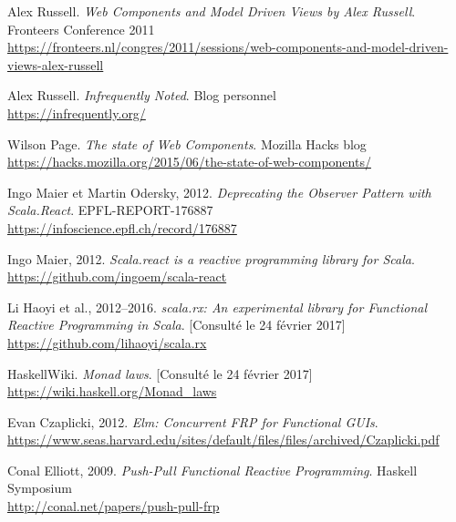 \begin{thebibliography}{99}

Alex Russell.
\emph{Web Components and Model Driven Views by Alex Russell}.
Fronteers Conference 2011\\
\url{https://fronteers.nl/congres/2011/sessions/web-components-and-model-driven-views-alex-russell}

Alex Russell.
\emph{Infrequently Noted}.
Blog personnel\\
\url{https://infrequently.org/}

Wilson Page.
\emph{The state of Web Components}.
Mozilla Hacks blog\\
\url{https://hacks.mozilla.org/2015/06/the-state-of-web-components/}

Ingo Maier et Martin Odersky, 2012.
\emph{Deprecating the Observer Pattern with Scala.React}.
EPFL-REPORT-176887\\
\url{https://infoscience.epfl.ch/record/176887}

Ingo Maier, 2012.
\emph{Scala.react is a reactive programming library for Scala}.\\
\url{https://github.com/ingoem/scala-react}

Li Haoyi et al., 2012--2016.
\emph{scala.rx: An experimental library for Functional Reactive Programming in Scala}.
[Consulté le 24 février 2017]\\
\url{https://github.com/lihaoyi/scala.rx}

HaskellWiki.
\emph{Monad laws}.
[Consulté le 24 février 2017]\\
\url{https://wiki.haskell.org/Monad_laws}

Evan Czaplicki, 2012.
\emph{Elm: Concurrent FRP for Functional GUIs}.
\\
\url{https://www.seas.harvard.edu/sites/default/files/files/archived/Czaplicki.pdf}

Conal Elliott, 2009.
\emph{Push-Pull Functional Reactive Programming}.
Haskell Symposium\\
\url{http://conal.net/papers/push-pull-frp}

\end{thebibliography}